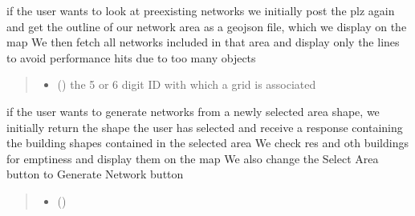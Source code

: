 \documentclass[letterpaper,10pt,english]{sphinxmanual}
\begin{document}

\begin{fulllineitems}
\label{\detokenize{docs_gui/js_api/postcode_editor/display_postcode:getPostalCodeAreaByID}}
\pysigstartsignatures
{}
\pysigstopsignatures
\sphinxAtStartPar
if the user wants to look at preexisting networks we initially post the plz again and get the outline of our network area as a geojson file,
which we display on the map
We then fetch all networks included in that area and display only the lines to avoid performance hits due to too many objects
\begin{quote}\begin{description}
\begin{itemize}
\item {} 
\sphinxAtStartPar
{} () \textendash{} the 5 or 6 digit ID with which a grid is associated

\end{itemize}

\end{description}\end{quote}

\end{fulllineitems}


\begin{fulllineitems}
\label{\detokenize{docs_gui/js_api/postcode_editor/display_postcode:getPostalCodeAreaByShape}}
\pysigstartsignatures
{}
\pysigstopsignatures
\sphinxAtStartPar
if the user wants to generate networks from a newly selected area shape, we initially return the shape the user has selected and receive a response
containing the building shapes contained in the selected area
We check res and oth buildings for emptiness and display them on the map
We also change the Select Area button to Generate Network button
\begin{quote}\begin{description}
\begin{itemize}
\item {} 
\sphinxAtStartPar
{} () \textendash{} 

\end{itemize}

\end{description}\end{quote}

\end{fulllineitems}
\end{document}

